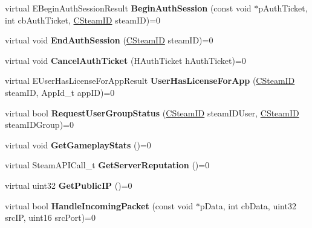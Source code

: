 \begin{DoxyCompactItemize}
virtual E\+Begin\+Auth\+Session\+Result {\bfseries Begin\+Auth\+Session} (const void $\ast$p\+Auth\+Ticket, int cb\+Auth\+Ticket, \hyperlink{class_c_steam_i_d}{C\+Steam\+ID} steam\+ID)=0
\item 
\mbox{\label{class_i_steam_game_server_a944167b456b305a8ef900fb630dfd004}} 
virtual void {\bfseries End\+Auth\+Session} (\hyperlink{class_c_steam_i_d}{C\+Steam\+ID} steam\+ID)=0
\item 
\mbox{\label{class_i_steam_game_server_aa81313a4303f97e486177d532b302a1a}} 
virtual void {\bfseries Cancel\+Auth\+Ticket} (H\+Auth\+Ticket h\+Auth\+Ticket)=0
\item 
\mbox{\label{class_i_steam_game_server_add3a59d9012302094cf0fa6e58df68b9}} 
virtual E\+User\+Has\+License\+For\+App\+Result {\bfseries User\+Has\+License\+For\+App} (\hyperlink{class_c_steam_i_d}{C\+Steam\+ID} steam\+ID, App\+Id\+\_\+t app\+ID)=0
\item 
\mbox{\label{class_i_steam_game_server_a26660da8b7897075ac8d45b6c60a5fab}} 
virtual bool {\bfseries Request\+User\+Group\+Status} (\hyperlink{class_c_steam_i_d}{C\+Steam\+ID} steam\+I\+D\+User, \hyperlink{class_c_steam_i_d}{C\+Steam\+ID} steam\+I\+D\+Group)=0
\item 
\mbox{\label{class_i_steam_game_server_a8700f90d3c1b911978db600d3f34c3db}} 
virtual void {\bfseries Get\+Gameplay\+Stats} ()=0
\item 
\mbox{\label{class_i_steam_game_server_aea1658bc505a5caf2d9bd2c725bb0839}} 
virtual Steam\+A\+P\+I\+Call\+\_\+t {\bfseries Get\+Server\+Reputation} ()=0
\item 
\mbox{\label{class_i_steam_game_server_af47eae625782ed0d11e51c58774e5e6a}} 
virtual uint32 {\bfseries Get\+Public\+IP} ()=0
\item 
\mbox{\label{class_i_steam_game_server_a8923da7ae2b7a1cc178ec81f4f2d6cba}} 
virtual bool {\bfseries Handle\+Incoming\+Packet} (const void $\ast$p\+Data, int cb\+Data, uint32 src\+IP, uint16 src\+Port)=0
\item 

\end{DoxyCompactItemize}
